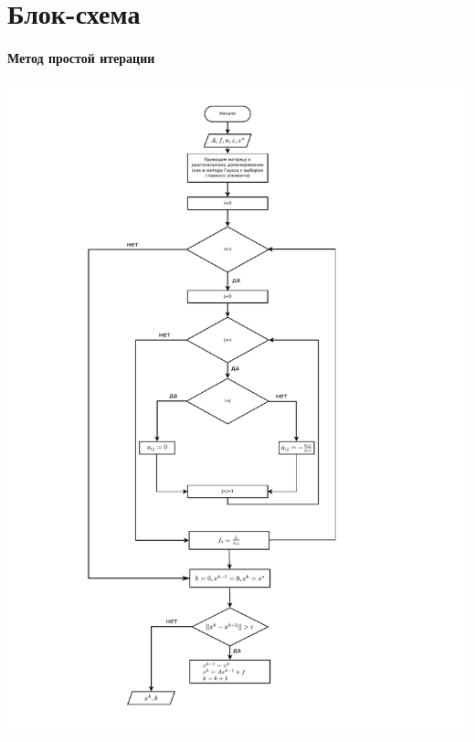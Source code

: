 \documentclass[a4paper,11pt]{extarticle}
\begin{document}
\part*{Блок-схема} 
 \subsection*{Метод простой итерации}
 \includegraphics[scale=0.9]{flowchartSimple1.pdf} 
 \newpage
\end{document}
